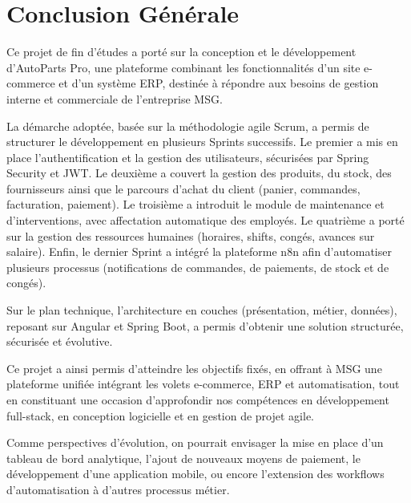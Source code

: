 \chapter*{Conclusion Générale}

Ce projet de fin d'études a porté sur la conception et le développement
d'AutoParts Pro, une plateforme combinant les fonctionnalités d'un site
e-commerce et d'un système ERP, destinée à répondre aux besoins de gestion
interne et commerciale de l'entreprise MSG.

La démarche adoptée, basée sur la méthodologie agile Scrum, a permis de
structurer le développement en plusieurs Sprints successifs. Le premier a
mis en place l'authentification et la gestion des utilisateurs, sécurisées
par Spring Security et JWT. Le deuxième a couvert la gestion des produits,
du stock, des fournisseurs ainsi que le parcours d'achat du client
(panier, commandes, facturation, paiement). Le troisième a introduit le
module de maintenance et d'interventions, avec affectation automatique
des employés. Le quatrième a porté sur la gestion des ressources humaines
(horaires, shifts, congés, avances sur salaire). Enfin, le dernier Sprint
a intégré la plateforme n8n afin d'automatiser plusieurs processus
(notifications de commandes, de paiements, de stock et de congés).

Sur le plan technique, l'architecture en couches (présentation, métier,
données), reposant sur Angular et Spring Boot, a permis d'obtenir une
solution structurée, sécurisée et évolutive.

Ce projet a ainsi permis d'atteindre les objectifs fixés, en offrant à MSG
une plateforme unifiée intégrant les volets e-commerce, ERP et
automatisation, tout en constituant une occasion d'approfondir nos
compétences en développement full-stack, en conception logicielle et en
gestion de projet agile.

Comme perspectives d'évolution, on pourrait envisager la mise en place
d'un tableau de bord analytique, l'ajout de nouveaux moyens de paiement,
le développement d'une application mobile, ou encore l'extension des
workflows d'automatisation à d'autres processus métier.